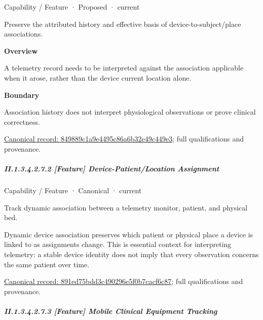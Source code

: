 \label{element:849889c1a9e4495c86a6b32e49c449e3}
{\small Capability / Feature · Proposed · current}\par

Preserve the attributed history and effective basis of device-to-subject/place associations.



\textbf{Overview}



A telemetry record needs to be interpreted against the association applicable when it arose, rather than the device current location alone.



\textbf{Boundary}



Association history does not interpret physiological observations or prove clinical correctness.


{\footnotesize \href{../../../../continuum/strategy/capability/feature/849889c1a9e4495c86a6b32e49c449e3.md}{Canonical record: 849889c1a9e4495c86a6b32e49c449e3}; full qualifications and provenance.}\par
\subparagraph*{II.1.3.4.2.7.2 [Feature] Device-Patient/Location Assignment}
\label{navigation:II.1.3.4.2.7.2}

\label{element:891ed75bdd3c490296e5f0b7cacf6c87}
{\small Capability / Feature · Canonical · current}\par

Track dynamic association between a telemetry monitor, patient, and physical bed.



Dynamic device association preserves which patient or physical place a device is linked to as assignments change. This is essential context for interpreting telemetry: a stable device identity does not imply that every observation concerns the same patient over time.


{\footnotesize \href{../../../../continuum/strategy/capability/feature/891ed75bdd3c490296e5f0b7cacf6c87.md}{Canonical record: 891ed75bdd3c490296e5f0b7cacf6c87}; full qualifications and provenance.}\par
\subparagraph*{II.1.3.4.2.7.3 [Feature] Mobile Clinical Equipment Tracking}
\label{navigation:II.1.3.4.2.7.3}

